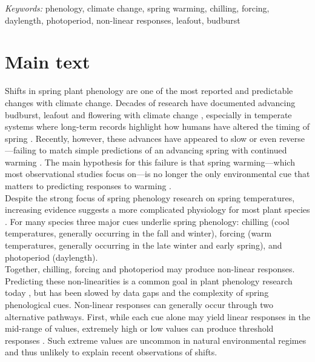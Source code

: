 \documentclass[11pt,letter]{article}
\begin{document}
\noindent \emph{Keywords:} phenology, climate change, spring warming, chilling, forcing, daylength, photoperiod, non-linear responses, leafout, budburst\\

\newpage
\linenumbers
\section{Main text} %
Shifts in spring plant phenology are one of the most reported and predictable changes with climate change. Decades of research have documented advancing budburst, leafout and flowering with climate change \citep{delpierre2009, yu2010,Ellwood2012,jochner2013,hereford2017}, especially in temperate systems where long-term records highlight how humans have altered the timing of spring \citep{Schwartz:1997nn,Menzel2003a,menzel2006}. Recently, however, these advances have appeared to slow \citep{fu2015} or even reverse \citep{yu2010}---failing to match simple predictions of an advancing spring with continued warming \citep{Ellwood2012}. The main hypothesis for this failure is that spring warming---which most observational studies focus on---is no longer the only environmental cue that matters to predicting responses to warming \citep{chuine2016,gauzere2019}.\\ 

Despite the strong focus of spring phenology research on spring temperatures, increasing evidence suggests a more complicated physiology for most plant species \citep[e.g.,][]{zohner2016,gauzere2019,ettinger2020}. For many species three major cues underlie spring phenology: chilling (cool temperatures, generally occurring in the fall and winter), forcing (warm temperatures, generally occurring in the late winter and early spring), and photoperiod (daylength). \\ %

Together, chilling, forcing and photoperiod may produce non-linear responses. Predicting these non-linearities is a common goal in plant phenology research today \citep{gusewell2017,chen2019}, but has been slowed by data gaps and the complexity of spring phenological cues. Non-linear responses can generally occur through two alternative pathways. First, while each cue alone may yield linear responses in the mid-range of values, extremely high or low values can produce threshold responses \citep{Heide:1993,Partanen:1998aa,Singh:2017,rinne2018}. Such extreme values are uncommon in natural environmental regimes and thus unlikely to explain recent observations of shifts. \\
\end{document}
